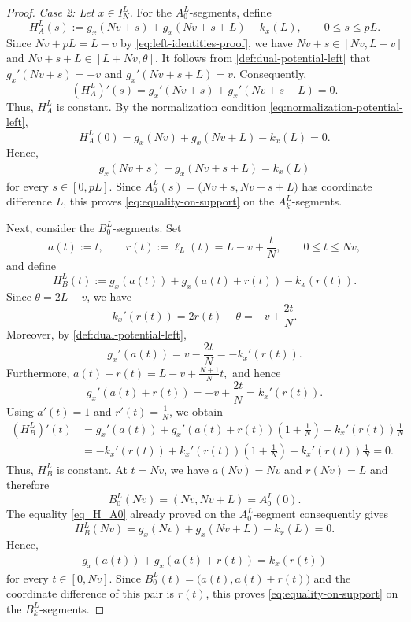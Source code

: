 \documentclass{article}
\begin{document}
\begin{proof}
\medskip
\noindent
\emph{Case 2: Let \(x\in I_N^L\).}
For the \(A_0^L\)-segments, define
\[
    H_A^L(s)
    :=
    g_x(Nv+s)+g_x(Nv+s+L)-k_x(L),
    \qquad
    0\leq s\leq pL.
\]
Since \(Nv+pL=L-v\) by \eqref{eq:left-identities-proof},
we have \(Nv+s\in[Nv,L-v]\) and \(Nv+s+L\in[L+Nv,\theta]\).
It follows from \eqref{def:dual-potential-left} that
\(g_x'(Nv+s)=-v\) and \(g_x'(Nv+s+L)=v\).
Consequently,
\[
    (H_A^L)'(s)
    =
    g_x'(Nv+s)+g_x'(Nv+s+L)
    =
    0.
\]
Thus, \(H_A^L\) is constant. By the normalization condition
\eqref{eq:normalization-potential-left},
\[
    H_A^L(0)
    =
    g_x(Nv)+g_x(Nv+L)-k_x(L)
    =
    0.
\]
Hence,
\begin{align}\label{eq_H_A0}
    g_x(Nv+s)+g_x(Nv+s+L)
    =
    k_x(L)
\end{align}
for every \(s\in[0,pL]\). Since
\(A_0^L(s)
    =
    \bigl(Nv+s,Nv+s+L\bigr)
\)
has coordinate difference \(L\), this proves \eqref{eq:equality-on-support} on the \(A_k^L\)-segments.

Next, consider the \(B_0^L\)-segments.
Set
\[
    a(t):=t,
    \qquad
    r(t):=\ell_L(t)=L-v+\frac{t}{N},
    \qquad
    0\leq t\leq Nv,
\]
and define
\[
    H_B^L(t)
    :=
    g_x(a(t))
    +
    g_x(a(t)+r(t))
    -
    k_x(r(t)).
\]
Since \(\theta=2L-v\), we have
\[
    k_x'(r(t))
    =
    2r(t)-\theta
    =
    -v+\frac{2t}{N}.
\]
Moreover, by \eqref{def:dual-potential-left},
\[
    g_x'(a(t))
    =
    v-\frac{2t}{N}
    =
    -k_x'(r(t)).
\]
Furthermore, \(a(t)+r(t) = L-v+\frac{N+1}{N}t, \) and hence
\[
    g_x'(a(t)+r(t))
    =
    -v+\frac{2t}{N}
    =
    k_x'(r(t)).
\]
Using \(a'(t)=1\) and \(r'(t)=\frac1N\), we obtain
\begin{align*}
    (H_B^L)'(t)
    &=
    g_x'(a(t))
    +
    g_x'(a(t)+r(t))
    \left(1+\frac1N\right)
    -
    k_x'(r(t))\frac1N
    \\
    &=
    -k_x'(r(t))
    +
    k_x'(r(t))
    \left(1+\frac1N\right)
    -
    k_x'(r(t))\frac1N
    =0.
\end{align*}
Thus, \(H_B^L\) is constant.
At \(t=Nv\), we have \(a(Nv)=Nv\) and \(r(Nv)=L\) and therefore
\[
    B_0^L(Nv)
    =
    (Nv,Nv+L)
    =
    A_0^L(0).
\]
The equality \eqref{eq_H_A0} already proved on the \(A_0^L\)-segment consequently gives
\[
    H_B^L(Nv)
    =
    g_x(Nv)+g_x(Nv+L)-k_x(L)
    =
    0.
\]
Hence,
\begin{align}\label{eq:H_BL}
    g_x(a(t))+g_x(a(t)+r(t))
    =
    k_x(r(t))
\end{align}
for every \(t\in[0,Nv]\).
Since \(B_0^L(t) = \bigl(a(t),a(t)+r(t)\bigr) \) and the coordinate difference of this pair is \(r(t)\), this proves \eqref{eq:equality-on-support} on the \(B_k^L\)-segments.


\end{proof}
\end{document}
